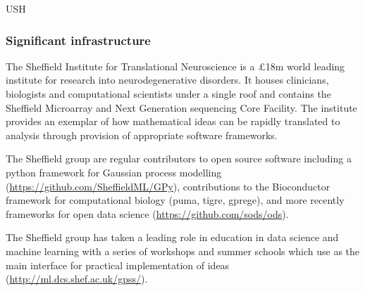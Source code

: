 \begin{sitedescription}{USH}
\subsubsection*{Significant infrastructure}
\begin{compactenum}
\item The Sheffield Institute for Translational Neuroscience is a \pounds 18m world leading institute for research into neurodegenerative disorders. It houses clinicians, biologists and computational scientists under a single roof and contains the Sheffield Microarray and Next Generation sequencing Core Facility. The institute provides an exemplar of how mathematical ideas can be rapidly translated to analysis through provision of appropriate software frameworks.
\item The Sheffield group are regular contributors to open source software including a python framework for Gaussian process modelling (\url{https://github.com/SheffieldML/GPy}), contributions to the Bioconductor framework for computational biology (puma, tigre, gprege), and more recently frameworks for open data science (\url{https://github.com/sods/ods}).  
\item The Sheffield group has taken a leading role in education in data science and machine learning with a series of workshops and summer schools which use \Jupyter as the main interface for practical implementation of ideas (\url{http://ml.dcs.shef.ac.uk/gpss/}).

\end{compactenum}
\end{sitedescription}


